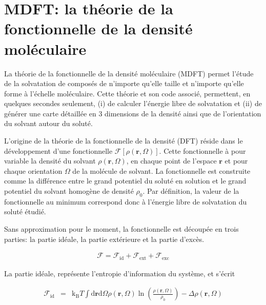 \chapter{MDFT: la théorie de la fonctionnelle de la densité moléculaire}
\label{chap:theorie}



La théorie de la fonctionnelle de la densité moléculaire (MDFT) permet l'étude de la solvatation de composés de n'importe qu'elle taille et n'importe qu'elle forme à l'échelle moléculaire. Cette théorie et son code associé, permettent, en quelques secondes seulement, (i) de calculer l'énergie libre de solvatation et (ii) de générer une carte détaillée en 3 dimensions de la densité ainsi que de l'orientation du solvant autour du soluté.


L'origine de la théorie de la fonctionnelle de la densité (DFT) réside dans le développement d'une fonctionnelle $\mathcal{F}[\rho\left(\boldsymbol{r},\Omega \right)]$. Cette fonctionnelle à pour variable la densité du solvant $\rho\left(\boldsymbol{r},\Omega \right)$, en chaque point de l'espace $\boldsymbol{r}$ et pour chaque orientation $\Omega$ de la molécule de solvant. La fonctionnelle est construite comme la différence entre le grand potentiel du soluté en solution et le grand potentiel du solvant homogène de densité $\rho_{0}$. Par définition, la valeur de la fonctionnelle au minimum correspond donc à l'énergie libre de solvatation du soluté étudié. 

Sans approximation pour le moment, la fonctionnelle est découpée en trois parties: la partie idéale, la partie extérieure et la partie d'excès\cite{evans_density_2009,henderson_fundamentals_1992}. 


\begin{eqnarray}
\mathcal{F} = \mathcal{F}_\mathrm{id} + \mathcal{F}_\mathrm{ext} + \mathcal{F}_\mathrm{exc}
\label{eq:fonctionnelle}
\end{eqnarray}

La partie idéale, représente l’entropie d'information du système, et s'écrit

\begin{eqnarray}
\mathcal{F}_\mathrm{id}&=&\mathrm{k_B}T\int\mathrm{d}\boldsymbol{r}\mathrm{d}\Omega \rho\left(\boldsymbol{r},\Omega \right)\ln\left(\frac{\rho\left(\boldsymbol{r},\Omega \right)}{\rho_0}\right)-\Delta\rho\left(\boldsymbol{r},\Omega \right)
\label{eq:fonctionnelle:id}
\end{eqnarray}

